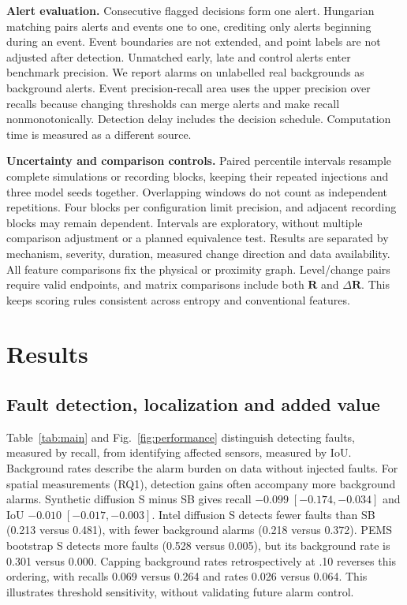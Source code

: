 \documentclass{llncs}
\newcommand{\R}{\mathbf R}
\begin{document}
\textbf{Alert evaluation.} Consecutive flagged decisions form one alert.
Hungarian matching pairs alerts and events one to one, crediting only alerts
beginning during an event. Event boundaries are not extended, and point
labels are not adjusted after detection. Unmatched early, late and control
alerts enter benchmark precision. We report alarms on unlabelled real
backgrounds as background alerts. Event precision-recall area uses the upper
precision  over recalls because changing thresholds can
merge alerts and make recall nonmonotonically. Detection delay includes the
decision schedule. Computation time is measured as a different source.

\textbf{Uncertainty and comparison controls.} Paired percentile intervals
resample complete simulations or recording blocks, keeping their repeated
injections and three model seeds together. Overlapping windows do not count
as independent repetitions. Four blocks per configuration limit precision,
and adjacent recording blocks may remain dependent. Intervals are exploratory,
without multiple comparison adjustment or a planned equivalence test.
Results are separated by mechanism, severity, duration, measured change
direction and data availability. All feature comparisons fix the physical
or proximity graph. Level/change pairs require valid endpoints, and matrix
comparisons include both $\R$ and $\Delta\R$. This keeps scoring rules
consistent across entropy and conventional features.




\section{Results}

\subsection{Fault detection, localization and added value}
Table~\ref{tab:main} and Fig.~\ref{fig:performance} distinguish detecting
faults, measured by recall, from identifying affected sensors, measured by IoU.
Background rates describe the alarm burden on data without injected faults.
For spatial measurements (RQ1), detection gains often accompany more
background alarms. Synthetic diffusion S minus SB gives recall
$-0.099\;[-0.174,-0.034]$ and IoU $-0.010\;[-0.017,-0.003]$.
Intel diffusion S detects fewer faults than SB (0.213 versus 0.481),
with fewer background alarms (0.218 versus 0.372).
PEMS bootstrap S detects more faults (0.528 versus 0.005), but its
background rate is 0.301 versus 0.000. Capping background rates
retrospectively at .10 reverses this ordering, with recalls 0.069 versus
0.264 and rates 0.026 versus 0.064. This illustrates threshold sensitivity,
without validating future alarm control.
\end{document}
